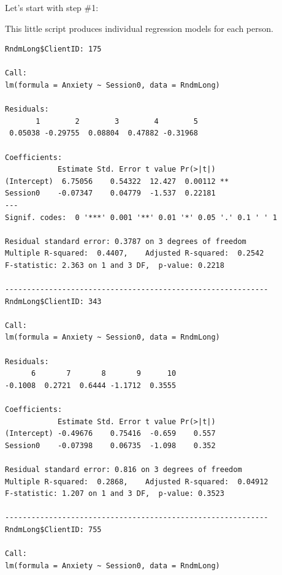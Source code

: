 \documentclass[
  english,
]{book}
\newenvironment{Shaded}{\begin{snugshade}}{\end{snugshade}}
\newcommand{\AttributeTok}[1]{\textcolor[rgb]{0.77,0.63,0.00}{#1}}
\newcommand{\ControlFlowTok}[1]{\textcolor[rgb]{0.13,0.29,0.53}{\textbf{#1}}}
\newcommand{\FunctionTok}[1]{\textcolor[rgb]{0.00,0.00,0.00}{#1}}
\newcommand{\NormalTok}[1]{#1}
\newcommand{\OtherTok}[1]{\textcolor[rgb]{0.56,0.35,0.01}{#1}}
\newcommand{\SpecialCharTok}[1]{\textcolor[rgb]{0.00,0.00,0.00}{#1}}
\begin{document}
Let's start with step \#1:

This little script produces individual regression models for each person.

\begin{Shaded}
\end{Shaded}

\begin{verbatim}
RndmLong$ClientID: 175

Call:
lm(formula = Anxiety ~ Session0, data = RndmLong)

Residuals:
       1        2        3        4        5 
 0.05038 -0.29755  0.08804  0.47882 -0.31968 

Coefficients:
            Estimate Std. Error t value Pr(>|t|)   
(Intercept)  6.75056    0.54322  12.427  0.00112 **
Session0    -0.07347    0.04779  -1.537  0.22181   
---
Signif. codes:  0 '***' 0.001 '**' 0.01 '*' 0.05 '.' 0.1 ' ' 1

Residual standard error: 0.3787 on 3 degrees of freedom
Multiple R-squared:  0.4407,    Adjusted R-squared:  0.2542 
F-statistic: 2.363 on 1 and 3 DF,  p-value: 0.2218

------------------------------------------------------------ 
RndmLong$ClientID: 343

Call:
lm(formula = Anxiety ~ Session0, data = RndmLong)

Residuals:
      6       7       8       9      10 
-0.1008  0.2721  0.6444 -1.1712  0.3555 

Coefficients:
            Estimate Std. Error t value Pr(>|t|)
(Intercept) -0.49676    0.75416  -0.659    0.557
Session0    -0.07398    0.06735  -1.098    0.352

Residual standard error: 0.816 on 3 degrees of freedom
Multiple R-squared:  0.2868,    Adjusted R-squared:  0.04912 
F-statistic: 1.207 on 1 and 3 DF,  p-value: 0.3523

------------------------------------------------------------ 
RndmLong$ClientID: 755

Call:
lm(formula = Anxiety ~ Session0, data = RndmLong)


\end{verbatim}
\end{document}
